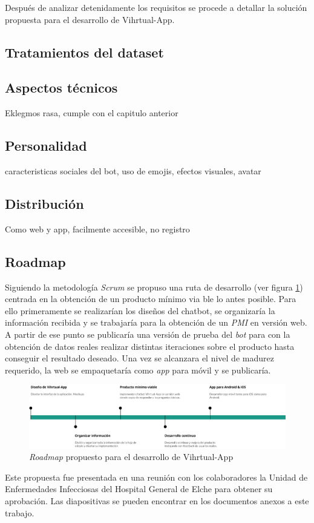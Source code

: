 Después de analizar detenidamente los requisitos se procede a detallar la solución propuesta para el desarrollo de Vihrtual-App.

\subsection{Tratamientos del dataset}

\subsection{Aspectos técnicos}
Eklegmos rasa, cumple con el capitulo anterior

\subsection{Personalidad}
caracteristicas sociales del bot, uso de emojis, efectos visuales, avatar

\subsection{Distribución}
Como web y app, facilmente accesible, no registro

\subsection{Roadmap}
Siguiendo la metodología \textit{Scrum} se propuso una ruta de desarrollo (ver figura \ref{fig:roadmap desarrollo}) centrada en la obtención de un producto mínimo via	ble lo antes posible. Para ello primeramente se realizarían los diseños del chatbot, se organizaría la información recibida y se trabajaría para la obtención de un \textit{PMI} en versión web. A partir de ese punto se publicaría una versión de prueba del \textit{bot} para con la obtención de datos reales realizar distintas iteraciones sobre el producto hasta conseguir el resultado deseado. Una vez se alcanzara el nivel de madurez requerido, la web se empaquetaría como \textit{app} para móvil y se publicaría.\\

\begin{figure}[htbp]
\centering
\includegraphics[scale=0.4]{../images/roadmap.png} 
\caption{\textit{Roadmap} propuesto para el desarrollo de Vihrtual-App}
\label{fig:roadmap desarrollo}
\end{figure}

Este propuesta fue presentada en una reunión con los colaboradores la Unidad de Enfermedades Infecciosas del Hospital General de Elche para obtener su aprobación. Las diapositivas se pueden encontrar en los documentos anexos a este trabajo.\\